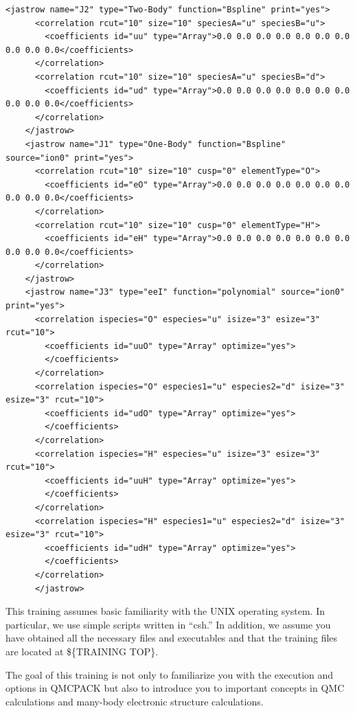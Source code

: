 \begin{lstlisting}[style=QMCPXML,caption=``Sample Jastrow XML block.",label=fig:lam_xml_jastrow]
<jastrow name="J2" type="Two-Body" function="Bspline" print="yes">
      <correlation rcut="10" size="10" speciesA="u" speciesB="u">
        <coefficients id="uu" type="Array">0.0 0.0 0.0 0.0 0.0 0.0 0.0 0.0 0.0 0.0</coefficients>
      </correlation>
      <correlation rcut="10" size="10" speciesA="u" speciesB="d">
        <coefficients id="ud" type="Array">0.0 0.0 0.0 0.0 0.0 0.0 0.0 0.0 0.0 0.0</coefficients>
      </correlation>
    </jastrow>
    <jastrow name="J1" type="One-Body" function="Bspline" source="ion0" print="yes">
      <correlation rcut="10" size="10" cusp="0" elementType="O">
        <coefficients id="eO" type="Array">0.0 0.0 0.0 0.0 0.0 0.0 0.0 0.0 0.0 0.0</coefficients>
      </correlation>
      <correlation rcut="10" size="10" cusp="0" elementType="H">
        <coefficients id="eH" type="Array">0.0 0.0 0.0 0.0 0.0 0.0 0.0 0.0 0.0 0.0</coefficients>
      </correlation>
    </jastrow>
    <jastrow name="J3" type="eeI" function="polynomial" source="ion0" print="yes">
      <correlation ispecies="O" especies="u" isize="3" esize="3" rcut="10">
        <coefficients id="uuO" type="Array" optimize="yes">
        </coefficients>
      </correlation>
      <correlation ispecies="O" especies1="u" especies2="d" isize="3" esize="3" rcut="10">
        <coefficients id="udO" type="Array" optimize="yes">
        </coefficients>
      </correlation>
      <correlation ispecies="H" especies="u" isize="3" esize="3" rcut="10">
        <coefficients id="uuH" type="Array" optimize="yes">
        </coefficients>
      </correlation>
      <correlation ispecies="H" especies1="u" especies2="d" isize="3" esize="3" rcut="10">
        <coefficients id="udH" type="Array" optimize="yes">
        </coefficients>
      </correlation>
      </jastrow>
\end{lstlisting}

This training assumes basic familiarity with the UNIX operating system. In particular,
we use simple scripts written in “csh.” In addition, we assume you have obtained
all the necessary files and executables and that the training files are located
at \$\{TRAINING TOP\}.

The goal of this training is not only to familiarize you with the execution and
options in QMCPACK but also to introduce you to important concepts in QMC calculations and many-body electronic structure calculations.




